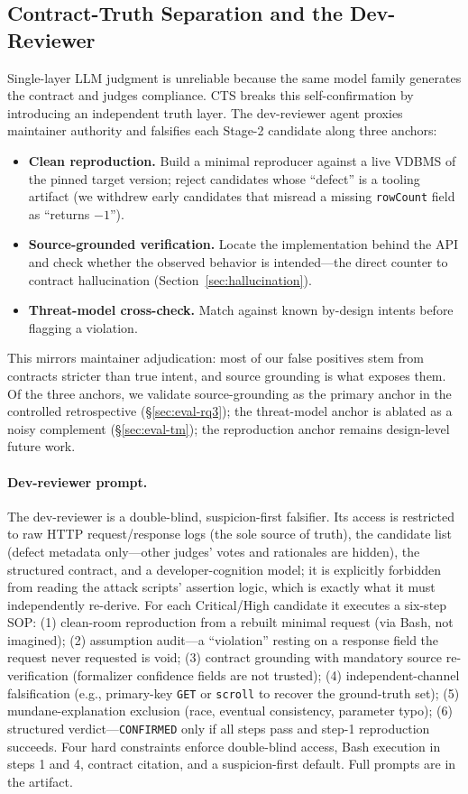 \documentclass[sigconf]{acmart}
\begin{document}
\subsection{Contract-Truth Separation and the Dev-Reviewer}\label{sec:cts}
Single-layer LLM judgment is unreliable because the same model family generates the contract and judges compliance. CTS breaks this self-confirmation by introducing an independent truth layer. The dev-reviewer agent proxies maintainer authority and falsifies each Stage-2 candidate along three anchors:
\begin{itemize}[leftmargin=*,itemsep=2pt]
\item \textbf{Clean reproduction.} Build a minimal reproducer against a live VDBMS of the pinned target version; reject candidates whose ``defect'' is a tooling artifact (we withdrew early candidates that misread a missing \texttt{rowCount} field as ``returns $-1$'').
\item \textbf{Source-grounded verification.} Locate the implementation behind the API and check whether the observed behavior is intended---the direct counter to contract hallucination (Section~\ref{sec:hallucination}).
\item \textbf{Threat-model cross-check.} Match against known by-design intents before flagging a violation.
\end{itemize}
This mirrors maintainer adjudication: most of our false positives stem from contracts stricter than true intent, and source grounding is what exposes them. Of the three anchors, we validate source-grounding as the primary anchor in the controlled retrospective (\S\ref{sec:eval-rq3}); the threat-model anchor is ablated as a noisy complement (\S\ref{sec:eval-tm}); the reproduction anchor remains design-level future work.

\paragraph{Dev-reviewer prompt.} The dev-reviewer is a double-blind, suspicion-first falsifier. Its access is restricted to raw HTTP request/response logs (the sole source of truth), the candidate list (defect metadata only---other judges' votes and rationales are hidden), the structured contract, and a developer-cognition model; it is explicitly forbidden from reading the attack scripts' assertion logic, which is exactly what it must independently re-derive. For each Critical/High candidate it executes a six-step SOP: (1) clean-room reproduction from a rebuilt minimal request (via Bash, not imagined); (2) assumption audit---a ``violation'' resting on a response field the request never requested is void; (3) contract grounding with mandatory source re-verification (formalizer confidence fields are not trusted); (4) independent-channel falsification (e.g., primary-key \texttt{GET} or \texttt{scroll} to recover the ground-truth set); (5) mundane-explanation exclusion (race, eventual consistency, parameter typo); (6) structured verdict---\texttt{CONFIRMED} only if all steps pass and step-1 reproduction succeeds. Four hard constraints enforce double-blind access, Bash execution in steps 1 and 4, contract citation, and a suspicion-first default. Full prompts are in the artifact.
\end{document}
